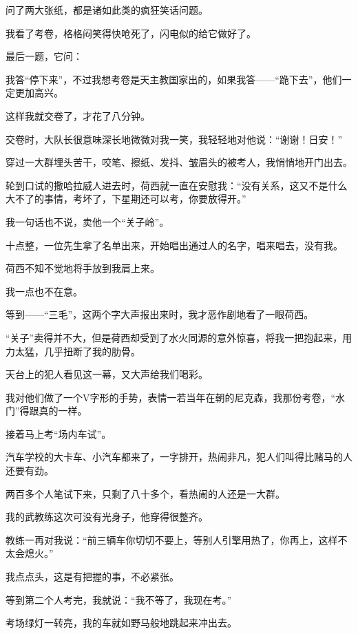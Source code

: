 \par 问了两大张纸，都是诸如此类的疯狂笑话问题。
\par 我看了考卷，格格闷笑得快呛死了，闪电似的给它做好了。
\par 最后一题，它问：
\par 我答“停下来”，不过我想考卷是天主教国家出的，如果我答——“跪下去”，他们一定更加高兴。
\par 这样我就交卷了，才花了八分钟。
\par 交卷时，大队长很意味深长地微微对我一笑，我轻轻地对他说：“谢谢！日安！”
\par 穿过一大群埋头苦干，咬笔、擦纸、发抖、皱眉头的被考人，我悄悄地开门出去。
\par 轮到口试的撒哈拉威人进去时，荷西就一直在安慰我：“没有关系，这又不是什么大不了的事情，考坏了，下星期还可以考，你要放得开。”
\par 我一句话也不说，卖他一个“关子岭”。
\par 十点整，一位先生拿了名单出来，开始唱出通过人的名字，唱来唱去，没有我。
\par 荷西不知不觉地将手放到我肩上来。
\par 我一点也不在意。
\par 等到——“三毛”，这两个字大声报出来时，我才恶作剧地看了一眼荷西。
\par “关子”卖得并不大，但是荷西却受到了水火同源的意外惊喜，将我一把抱起来，用力太猛，几乎扭断了我的肋骨。
\par 天台上的犯人看见这一幕，又大声给我们喝彩。
\par 我对他们做了一个V字形的手势，表情一若当年在朝的尼克森，我那份考卷，“水门”得跟真的一样。
\par 接着马上考“场内车试”。
\par 汽车学校的大卡车、小汽车都来了，一字排开，热闹非凡，犯人们叫得比赌马的人还要有劲。
\par 两百多个人笔试下来，只剩了八十多个，看热闹的人还是一大群。
\par 我的武教练这次可没有光身子，他穿得很整齐。
\par 教练一再对我说：“前三辆车你切切不要上，等别人引擎用热了，你再上，这样不太会熄火。”
\par 我点点头，这是有把握的事，不必紧张。
\par 等到第二个人考完，我就说：“我不等了，我现在考。”
\par 考场绿灯一转亮，我的车就如野马般地跳起来冲出去。
